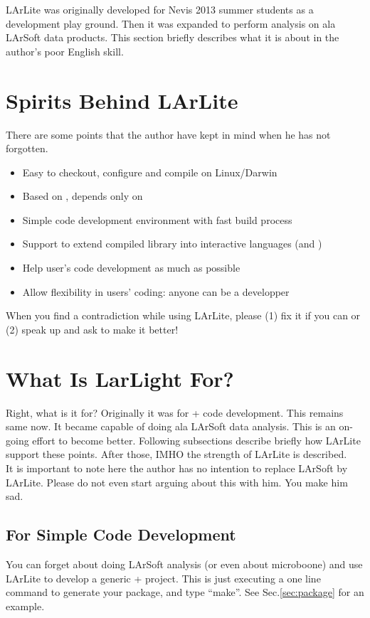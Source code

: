 
LArLite was originally developed for Nevis 2013 summer students as a \CPP development play ground.
Then it was expanded to perform analysis on ala LArSoft data products. 
This section briefly describes what it is about in the author's poor English skill.

\section{Spirits Behind LArLite}
There are some points that the author have kept in mind when he has not forgotten.
\begin{itemize}
\item Easy to checkout, configure and compile on Linux/Darwin
\item Based on \CPP, depends only on \ROOT
\item Simple code development environment with fast build process
\item Support to extend compiled library into interactive languages (\python and \CINT)
\item Help user's code development as much as possible
\item Allow flexibility in users' coding: anyone can be a developper
\end{itemize}
When you find a contradiction while using LArLite, please (1) fix it if you can or (2) speak up and ask to make it better! 

\section{What Is LarLight For?}
Right, what is it for?
Originally it was for \CPP + \ROOT code development. This remains same now.
It became capable of doing ala LArSoft data analysis. This is an on-going effort to become better.
Following subsections describe briefly how LArLite support these points.
After those, IMHO the strength of LArLite is described.\\

It is important to note here the author has no intention to replace LArSoft by LArLite. 
Please do not even start arguing about this with him. You make him sad.

\subsection{For Simple \CPP Code Development}
You can forget about doing LArSoft analysis (or even about microboone) and use LArLite to develop a generic \CPP + \ROOT project. This is just executing a one line command to generate your package, and type ``make''. See Sec.\ref{sec:package} for an example.

